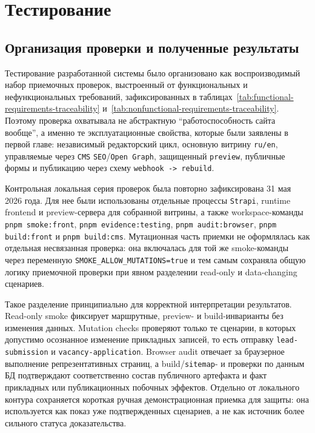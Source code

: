\section{Тестирование}

\subsection{Организация проверки и полученные результаты}

Тестирование разработанной системы было организовано как воспроизводимый набор
приемочных проверок, выстроенный от функциональных и нефункциональных требований,
зафиксированных в
таблицах~\ref{tab:functional-requirements-traceability} и~\ref{tab:nonfunctional-requirements-traceability}. Поэтому проверка охватывала не
абстрактную ``работоспособность сайта вообще'', а именно те эксплуатационные свойства,
которые были заявлены в первой главе: независимый редакторский цикл, основную витрину
\texttt{ru/en}, управляемые через \texttt{CMS} \texttt{SEO}/\texttt{Open Graph}, защищенный
\texttt{preview}, публичные формы и публикацию через схему
\texttt{webhook -> rebuild}.

Контрольная локальная серия проверок была повторно зафиксирована 31 мая 2026 года. Для нее были
использованы отдельные процессы \texttt{Strapi}, runtime frontend и preview-сервера для
собранной витрины, а также workspace-команды \texttt{pnpm smoke:front},
\texttt{pnpm evidence:testing}, \texttt{pnpm audit:browser}, \texttt{pnpm build:front}
и \texttt{pnpm build:cms}. Мутационная часть приемки не оформлялась как отдельная
несвязанная проверка: она включалась для той же smoke-команды через переменную
\texttt{SMOKE\_ALLOW\_MUTATIONS=true} и тем самым сохраняла общую логику приемочной
проверки при явном разделении read-only и data-changing сценариев.

Такое разделение принципиально для корректной интерпретации результатов. Read-only smoke
фиксирует маршрутные, preview- и build-инварианты без изменения данных. Mutation checks
проверяют только те сценарии, в которых допустимо осознанное изменение прикладных
записей, то есть отправку \texttt{lead-submission} и \texttt{vacancy-application}.
Browser audit отвечает за браузерное выполнение репрезентативных страниц, а
build/\texttt{sitemap}- и проверки по данным БД подтверждают соответственно состав
публичного артефакта и факт прикладных или публикационных побочных эффектов. Отдельно от
локального контура сохраняется короткая ручная демонстрационная приемка для защиты: она
используется как показ уже подтвержденных сценариев, а не как источник более сильного
статуса доказательства.


